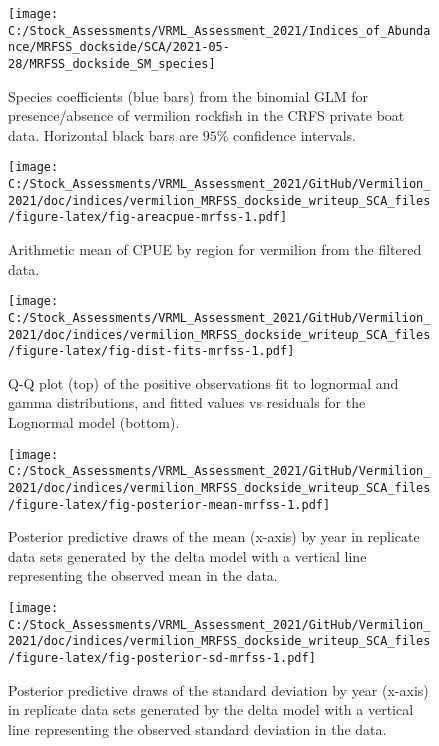 \documentclass[
]{article}
\begin{document}
\FloatBarrier

\begin{figure}
\texttt{[image: C:/Stock\_Assessments/VRML\_Assessment\_2021/Indices\_of\_Abundance/MRFSS\_dockside/SCA/2021-05-28/MRFSS\_dockside\_SM\_species]} \caption{Species coefficients (blue bars) from the binomial GLM for presence/absence of vermilion rockfish in the CRFS private boat data. Horizontal black bars are $95\%$ confidence intervals.}\label{fig:fig-sm-mrfss}
\end{figure}

\FloatBarrier

\begin{figure}
\centering
\texttt{[image: C:/Stock\_Assessments/VRML\_Assessment\_2021/GitHub/Vermilion\_2021/doc/indices/vermilion\_MRFSS\_dockside\_writeup\_SCA\_files/figure-latex/fig-areacpue-mrfss-1.pdf]}
\caption{\label{fig:fig-areacpue-mrfss}Arithmetic mean of CPUE by region for vermilion from the filtered data.}
\end{figure}

\begin{figure}
\centering
\texttt{[image: C:/Stock\_Assessments/VRML\_Assessment\_2021/GitHub/Vermilion\_2021/doc/indices/vermilion\_MRFSS\_dockside\_writeup\_SCA\_files/figure-latex/fig-dist-fits-mrfss-1.pdf]}
\caption{\label{fig:fig-dist-fits-mrfss}Q-Q plot (top) of the positive observations fit to lognormal and gamma distributions, and fitted values vs residuals for the Lognormal model (bottom).}
\end{figure}

\begin{figure}
\centering
\texttt{[image: C:/Stock\_Assessments/VRML\_Assessment\_2021/GitHub/Vermilion\_2021/doc/indices/vermilion\_MRFSS\_dockside\_writeup\_SCA\_files/figure-latex/fig-posterior-mean-mrfss-1.pdf]}
\caption{\label{fig:fig-posterior-mean-mrfss}Posterior predictive draws of the mean (x-axis) by year in replicate data sets generated by the delta model with a vertical line representing the observed mean in the data.}
\end{figure}

\FloatBarrier

\begin{figure}
\centering
\texttt{[image: C:/Stock\_Assessments/VRML\_Assessment\_2021/GitHub/Vermilion\_2021/doc/indices/vermilion\_MRFSS\_dockside\_writeup\_SCA\_files/figure-latex/fig-posterior-sd-mrfss-1.pdf]}
\caption{\label{fig:fig-posterior-sd-mrfss}Posterior predictive draws of the standard deviation by year (x-axis) in replicate data sets generated by the delta model with a vertical line representing the observed standard deviation in the data.}
\end{figure}
\end{document}
